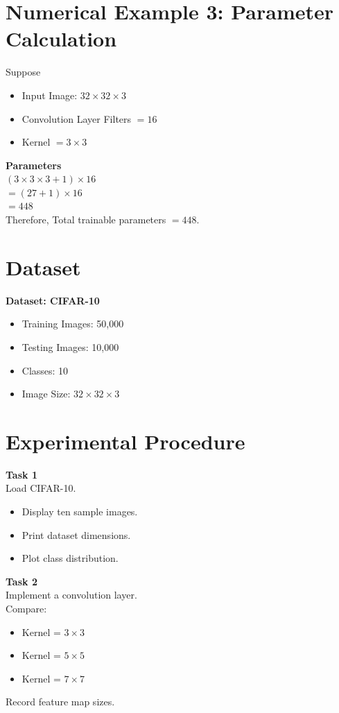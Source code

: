 \documentclass[11pt]{article}
\begin{document}
\section{Numerical Example 3: Parameter Calculation}
Suppose 
\begin{itemize}
    \item Input Image: $32\times32\times3$ 
    \item Convolution Layer Filters $= 16$ 
    \item Kernel $= 3\times3$ 
\end{itemize}
\textbf{Parameters} \\
$(3\times3\times3 + 1) \times 16$  \\
$= (27 + 1) \times 16$  \\
$= 448$  \\[0.2cm]
Therefore, Total trainable parameters $= 448$. 

\section{Dataset}
\textbf{Dataset: CIFAR-10} 
\begin{itemize}
    \item Training Images: 50,000 
    \item Testing Images: 10,000 
    \item Classes: 10 
    \item Image Size: $32\times32\times3$ 
\end{itemize}

\section{Experimental Procedure}

\textbf{Task 1} \\
Load CIFAR-10. 
\begin{itemize}
    \item Display ten sample images. 
    \item Print dataset dimensions. 
    \item Plot class distribution. 
\end{itemize}

\textbf{Task 2} \\
Implement a convolution layer.  \\
Compare: 
\begin{itemize}
    \item Kernel = $3\times3$ 
    \item Kernel = $5\times5$ 
    \item Kernel = $7\times7$ 
\end{itemize}
Record feature map sizes. 
\end{document}
